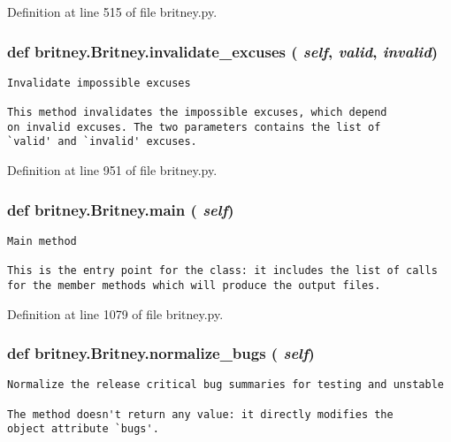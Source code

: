 Definition at line 515 of file britney.py.
\subsubsection{\setlength{\rightskip}{0pt plus 5cm}def britney.Britney.invalidate\_\-excuses ( {\em self},  {\em valid},  {\em invalid})}\label{classbritney_1_1Britney_171969785db449d7a06c3f762774e0cd}




\footnotesize\begin{verbatim}Invalidate impossible excuses

This method invalidates the impossible excuses, which depend
on invalid excuses. The two parameters contains the list of
`valid' and `invalid' excuses.
\end{verbatim}
\normalsize
 

Definition at line 951 of file britney.py.
\subsubsection{\setlength{\rightskip}{0pt plus 5cm}def britney.Britney.main ( {\em self})}\label{classbritney_1_1Britney_0e9551bdf927388f55be5ce15a48c94f}




\footnotesize\begin{verbatim}Main method

This is the entry point for the class: it includes the list of calls
for the member methods which will produce the output files.
\end{verbatim}
\normalsize
 

Definition at line 1079 of file britney.py.
\subsubsection{\setlength{\rightskip}{0pt plus 5cm}def britney.Britney.normalize\_\-bugs ( {\em self})}\label{classbritney_1_1Britney_5a6af4a100cfd54e872a27fa7f48ac3c}




\footnotesize\begin{verbatim}Normalize the release critical bug summaries for testing and unstable

The method doesn't return any value: it directly modifies the
object attribute `bugs'.
\end{verbatim}
\normalsize
 

